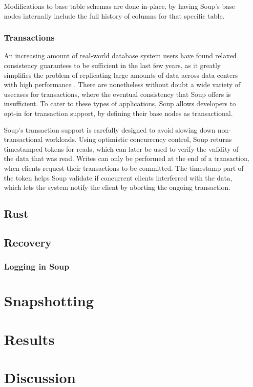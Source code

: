 \documentclass[b5paper,twoside]{report}
\begin{document}
Modifications to base table schemas are done in-place, by having Soup's base
nodes internally include the full history of columns for that specific table.

\subsection{Transactions}
An increasing amount of real-world database system users have found relaxed
consistency guarantees to be sufficient in the last few years, as it greatly
simplifies the problem of replicating large amounts of data across data centers
with high performance \cite{existential}. There are nonetheless without doubt
a wide variety of usecases for transactions, where the eventual consistency that
Soup offers is insufficient. To cater to these types of applications, Soup
allows developers to opt-in for transaction support, by defining their base
nodes as transactional.

Soup's transaction support is carefully designed to avoid slowing down
non-transactional workloads. Using optimistic concurrency control, Soup returns
timestamped tokens for reads, which can later be used to verify the validity of
the data that was read. Writes can only be performed at the end of a
transaction, when clients request their transactions to be committed. The
timestamp part of the token helps Soup validate if concurrent clients
interferred with the data, which lets the system notify the client by aborting
the ongoing transaction.

\section{Rust}

\section{Recovery}
\subsection{Logging in Soup}

\chapter{Snapshotting}
\chapter{Results}
\chapter{Discussion}



\end{document}
